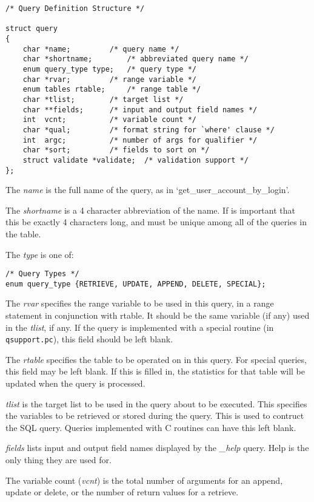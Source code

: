 \begin{verbatim}
/* Query Definition Structure */

struct query
{
    char *name;			/* query name */
    char *shortname;		/* abbreviated query name */
    enum query_type type;	/* query type */
    char *rvar;			/* range variable */
    enum tables rtable;		/* range table */
    char *tlist;		/* target list */
    char **fields;		/* input and output field names */
    int  vcnt;			/* variable count */
    char *qual;			/* format string for `where' clause */
    int  argc;			/* number of args for qualifier */
    char *sort;			/* fields to sort on */
    struct validate *validate;	/* validation support */
};
\end{verbatim}

The {\it name\/} is the full name of the query, as in
`get\_user\_account\_by\_login'.

The {\it shortname\/} is a 4 character abbreviation of the name.  If is
important that this be exactly 4 characters long, and must be unique
among all of the queries in the table.

The {\it type\/} is one of:

\begin{verbatim}
/* Query Types */
enum query_type {RETRIEVE, UPDATE, APPEND, DELETE, SPECIAL};
\end{verbatim}

The {\it rvar\/} specifies the range variable to be used in this
query, in a range statement in conjunction with rtable. It should be
the same variable (if any) used in the {\it tlist}, if any. If the
query is implemented with a special routine (in {\tt qsupport.pc}),
this field should be left blank.

The {\it rtable\/} specifies the table to be operated on in this
query. For special queries, this field may be left blank. If this is
filled in, the statistics for that table will be updated when the
query is processed.

{\it tlist\/} is the target list to be used in the query about to be
executed. This specifies the variables to be retrieved or stored
during the query. This is used to contruct the SQL query. Queries
implemented with C routines can have this left blank.

{\it fields\/} lists input and output field names displayed by the
{\it \_help\/} query. Help is the only thing they are used for.

The variable count ({\it vcnt\/}) is the total number of arguments for an
append, update or delete, or the number of return values for a
retrieve.

